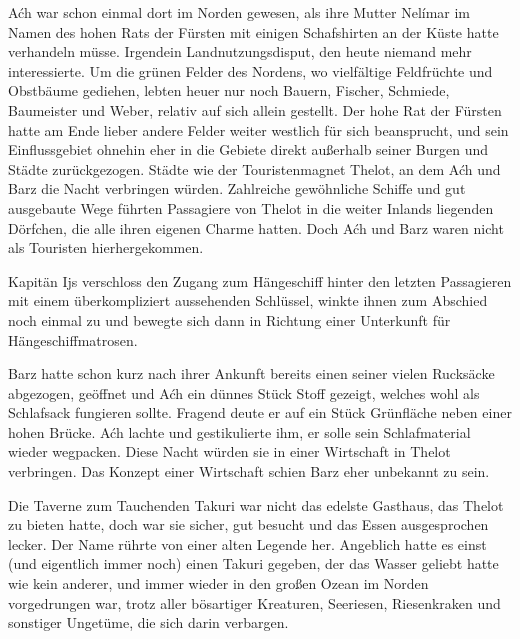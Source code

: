 Aćh war schon einmal dort im Norden gewesen, als ihre Mutter Nelímar im Namen des hohen Rats der Fürsten mit einigen Schafshirten an der Küste hatte verhandeln müsse. Irgendein Landnutzungsdisput, den heute niemand mehr interessierte. Um die grünen Felder des Nordens, wo vielfältige Feldfrüchte und Obstbäume gediehen, lebten heuer nur noch Bauern, Fischer, Schmiede, Baumeister und Weber, relativ auf sich allein gestellt. Der hohe Rat der Fürsten hatte am Ende lieber andere Felder weiter westlich für sich beansprucht, und sein Einflussgebiet ohnehin eher in die Gebiete direkt außerhalb seiner Burgen und Städte zurückgezogen. Städte wie der Touristenmagnet Thelot, an dem Aćh und Barz die Nacht verbringen würden. Zahlreiche gewöhnliche Schiffe und gut ausgebaute Wege führten Passagiere von Thelot in die weiter Inlands liegenden Dörfchen, die alle ihren eigenen Charme hatten. Doch Aćh und Barz waren nicht als Touristen hierhergekommen.



\trennzeichen



Kapitän Ijs verschloss den Zugang zum Hängeschiff hinter den letzten Passagieren mit einem überkompliziert aussehenden Schlüssel, winkte ihnen zum Abschied noch einmal zu und bewegte sich dann in Richtung einer Unterkunft für Hängeschiffmatrosen.

Barz hatte schon kurz nach ihrer Ankunft bereits einen seiner vielen Rucksäcke abgezogen, geöffnet und Aćh ein dünnes Stück Stoff gezeigt, welches wohl als Schlafsack fungieren sollte. Fragend deute er auf ein Stück Grünfläche neben einer hohen Brücke. Aćh lachte und gestikulierte ihm, er solle sein Schlafmaterial wieder wegpacken. Diese Nacht würden sie in einer Wirtschaft in Thelot verbringen. Das Konzept einer Wirtschaft schien Barz eher unbekannt zu sein.

Die Taverne zum Tauchenden Takuri war nicht das edelste Gasthaus, das Thelot zu bieten hatte, doch war sie sicher, gut besucht und das Essen ausgesprochen lecker. Der Name rührte von einer alten Legende her. Angeblich hatte es einst (und eigentlich immer noch) einen Takuri gegeben, der das Wasser geliebt hatte wie kein anderer, und immer wieder in den großen Ozean im Norden vorgedrungen war, trotz aller bösartiger Kreaturen, Seeriesen, Riesenkraken und sonstiger Ungetüme, die sich darin verbargen.

